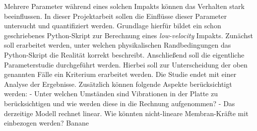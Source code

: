 Mehrere Parameter während eines solchen Impakts können das Verhalten stark beeinflussen. In dieser Projektarbeit sollen die Einflüsse dieser Parameter untersucht und quantifiziert werden. Grundlage hierfür bildet ein schon geschriebenes Python-Skript zur Berechnung eines \textit{low-velocity} Impakts. Zunächst soll erarbeitet werden, unter welchen physikalischen Randbedingungen das Python-Skript die Realität korrekt beschreibt. Anschließend soll die eigentliche Parameterstudie durchgeführt werden. Hierbei soll zur Unterscheidung der oben genannten Fälle ein Kriterium erarbeitet werden. Die Studie endet mit einer Analyse der Ergebnisse.
Zusätzlich können folgende Aspekte berücksichtigt werden: 
- Unter welchen Umständen sind Vibrationen in der Platte zu berücksichtigen und wie werden diese in die Rechnung aufgenommen?
- Das derzeitige Modell rechnet linear. Wie könnten nicht-lineare Membran-Kräfte mit einbezogen werden?
Banane

